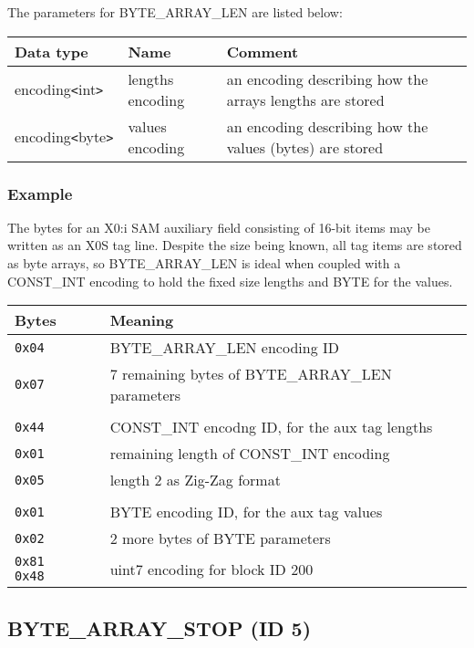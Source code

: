 \documentclass[a4paper]{article}
\begin{document}
The parameters for BYTE\_ARRAY\_LEN are listed below:

\begin{tabular}{|>{\raggedright}p{100pt}|>{\raggedright}p{100pt}|>{\raggedright}p{230pt}|}
\hline
\textbf{Data type} & \textbf{Name} & \textbf{Comment}
\tabularnewline
\hline
encoding\texttt{<}int\texttt{>} & lengths encoding & an encoding describing how 
the arrays lengths are stored\tabularnewline
\hline
encoding\texttt{<}byte\texttt{>} & values encoding & an encoding describing how 
the values (bytes) are stored\tabularnewline
\hline
\end{tabular}

\subsubsection*{Example}

The bytes for an X0:i SAM auxiliary field consisting of 16-bit items
may be written as an X0S tag line.  Despite the size being known, all
tag items are stored as byte arrays, so BYTE\_ARRAY\_LEN is ideal when
coupled with a CONST\_INT encoding to hold the fixed size lengths and
BYTE for the values.

\begin{tabular}{lll}
\hline
\textbf{Bytes} & & \textbf{Meaning}\\
\hline
\texttt{0x04}         & & BYTE\_ARRAY\_LEN encoding ID                                    \\
\texttt{0x07}         & & 7 remaining bytes of BYTE\_ARRAY\_LEN parameters            \\
\\
\texttt{0x44}         & & CONST\_INT encodng ID, for the aux tag lengths \\
\texttt{0x01}         & & remaining length of CONST\_INT encoding \\
\texttt{0x05}         & & length 2 as Zig-Zag format \\
\\
\texttt{0x01}         & & BYTE encoding ID, for the aux tag values \\
\texttt{0x02}         & & 2 more bytes of BYTE parameters                          \\
\texttt{0x81 0x48}    & & uint7 encoding for block ID 200                              \\
\hline
\end{tabular}

\subsection{BYTE\_ARRAY\_STOP (ID 5)}
\end{document}
